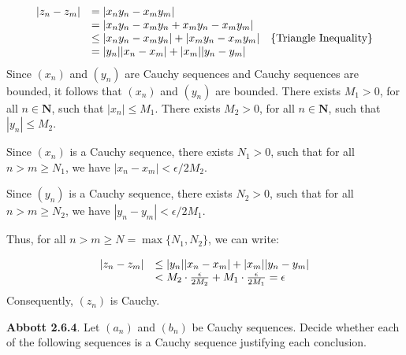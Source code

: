 \documentclass[10pt]{article}
\begin{document}
\begin{equation*}
\begin{array}{ c l c }
|z_{n} -z_{m} | & =|x_{n} y_{n} -x_{m} y_{m} | & \\
 & =|x_{n} y_{n} -x_{m} y_{n} +x_{m} y_{n} -x_{m} y_{m} | & \\
 & \leq |x_{n} y_{n} -x_{m} y_{n} |+|x_{m} y_{n} -x_{m} y_{m} | & \left\{\text{Triangle Inequality}\right\}\\
 & =|y_{n} ||x_{n} -x_{m} |+|x_{m} ||y_{n} -y_{m} | & 
\end{array}
\end{equation*}
Since $\displaystyle ( x_{n})$ and $\displaystyle ( y_{n})$ are Cauchy sequences and Cauchy sequences are bounded, it follows that $\displaystyle ( x_{n})$ and $\displaystyle ( y_{n})$ are bounded. There exists $\displaystyle M_{1}  >0$, for all $\displaystyle n\in \mathbf{N}$, such that $\displaystyle |x_{n} |\leq M_{1}$. There exists $\displaystyle M_{2}  >0$, for all $\displaystyle n\in \mathbf{N}$, such that $\displaystyle |y_{n} |\leq M_{2}$. 



Since $\displaystyle ( x_{n})$ is a Cauchy sequence, there exists $\displaystyle N_{1}  >0$, such that for all $\displaystyle n >m\geq N_{1}$, we have $\displaystyle |x_{n} -x_{m} |< \epsilon /2M_{2}$.



Since $\displaystyle ( y_{n})$ is a Cauchy sequence, there exists $\displaystyle N_{2}  >0$, such that for all $\displaystyle n >m\geq N_{2}$, we have $\displaystyle |y_{n} -y_{m} |< \epsilon /2M_{1}$. \ 



Thus, for all $\displaystyle n >m\geq N=\max\{N_{1} ,N_{2}\}$, we can write:




\begin{equation*}
\begin{array}{ c l }
|z_{n} -z_{m} | & \leq |y_{n} ||x_{n} -x_{m} |+|x_{m} ||y_{n} -y_{m} |\\
 & < M_{2} \cdot \frac{\epsilon }{2M_{2}} +M_{1} \cdot \frac{\epsilon }{2M_{1}} =\epsilon 
\end{array}
\end{equation*}
Consequently, $\displaystyle ( z_{n})$ is Cauchy.



\textbf{Abbott 2.6.4}. Let $\displaystyle ( a_{n})$ and $\displaystyle ( b_{n})$ be Cauchy sequences. Decide whether each of the following sequences is a Cauchy sequence justifying each conclusion.
\end{document}
